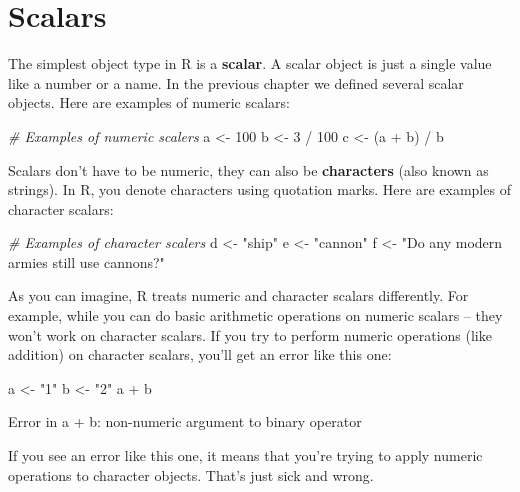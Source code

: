 \documentclass[]{book}
\newenvironment{Shaded}{\begin{snugshade}}{\end{snugshade}}
\newcommand{\DecValTok}[1]{\textcolor[rgb]{0.00,0.00,0.81}{{#1}}}
\newcommand{\StringTok}[1]{\textcolor[rgb]{0.31,0.60,0.02}{{#1}}}
\newcommand{\CommentTok}[1]{\textcolor[rgb]{0.56,0.35,0.01}{\textit{{#1}}}}
\newcommand{\NormalTok}[1]{{#1}}
\theoremstyle{definition}
\theoremstyle{definition}
\theoremstyle{remark}
\begin{document}
\section{Scalars}\label{scalars}

The simplest object type in R is a \textbf{scalar}. A scalar object is
just a single value like a number or a name. In the previous chapter we
defined several scalar objects. Here are examples of numeric scalars:

\begin{Shaded}
\begin{Highlighting}[]
\CommentTok{# Examples of numeric scalers}
\NormalTok{a <-}\StringTok{ }\DecValTok{100}
\NormalTok{b <-}\StringTok{ }\DecValTok{3} \NormalTok{/}\StringTok{ }\DecValTok{100}
\NormalTok{c <-}\StringTok{ }\NormalTok{(a +}\StringTok{ }\NormalTok{b) /}\StringTok{ }\NormalTok{b}
\end{Highlighting}
\end{Shaded}

Scalars don't have to be numeric, they can also be \textbf{characters}
(also known as strings). In R, you denote characters using quotation
marks. Here are examples of character scalars:

\begin{Shaded}
\begin{Highlighting}[]
\CommentTok{# Examples of character scalers}
\NormalTok{d <-}\StringTok{ "ship"}
\NormalTok{e <-}\StringTok{ "cannon"}
\NormalTok{f <-}\StringTok{ "Do any modern armies still use cannons?"}
\end{Highlighting}
\end{Shaded}

As you can imagine, R treats numeric and character scalars differently.
For example, while you can do basic arithmetic operations on numeric
scalars -- they won't work on character scalars. If you try to perform
numeric operations (like addition) on character scalars, you'll get an
error like this one:

\begin{Shaded}
\begin{Highlighting}[]
\NormalTok{a <-}\StringTok{ "1"}
\NormalTok{b <-}\StringTok{ "2"}
\NormalTok{a +}\StringTok{ }\NormalTok{b}
\end{Highlighting}
\end{Shaded}

Error in a + b: non-numeric argument to binary operator

If you see an error like this one, it means that you're trying to apply
numeric operations to character objects. That's just sick and wrong.
\end{document}
